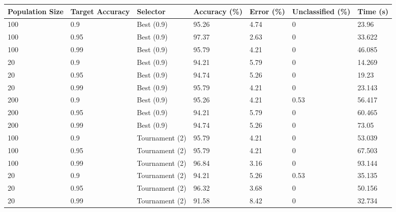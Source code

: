 \documentclass[a4paper]{article}
\begin{document}
\begin{table}[h!]
  \centering
  \begin{tabular}{@{}lllllll@{}}
    \toprule
    Population Size & Target Accuracy & Selector       & Accuracy (\%) & Error (\%) & Unclassified (\%) & Time (s) \\
    \midrule
    100             & 0.9             & Best (0.9)     & 95.26         & 4.74       & 0                 & 23.96    \\
    100             & 0.95            & Best (0.9)     & 97.37         & 2.63       & 0                 & 33.622   \\
    100             & 0.99            & Best (0.9)     & 95.79         & 4.21       & 0                 & 46.085   \\
    20              & 0.9             & Best (0.9)     & 94.21         & 5.79       & 0                 & 14.269   \\
    20              & 0.95            & Best (0.9)     & 94.74         & 5.26       & 0                 & 19.23    \\
    20              & 0.99            & Best (0.9)     & 95.79         & 4.21       & 0                 & 23.143   \\
    200             & 0.9             & Best (0.9)     & 95.26         & 4.21       & 0.53              & 56.417   \\
    200             & 0.95            & Best (0.9)     & 94.21         & 5.79       & 0                 & 60.465   \\
    200             & 0.99            & Best (0.9)     & 94.74         & 5.26       & 0                 & 73.05    \\
    100             & 0.9             & Tournament (2) & 95.79         & 4.21       & 0                 & 53.039   \\
    100             & 0.95            & Tournament (2) & 95.79         & 4.21       & 0                 & 67.503   \\
    100             & 0.99            & Tournament (2) & 96.84         & 3.16       & 0                 & 93.144   \\
    20              & 0.9             & Tournament (2) & 94.21         & 5.26       & 0.53              & 35.135   \\
    20              & 0.95            & Tournament (2) & 96.32         & 3.68       & 0                 & 50.156   \\
    20              & 0.99            & Tournament (2) & 91.58         & 8.42       & 0                 & 32.734   \\

\end{tabular}
\end{table}
\end{document}
